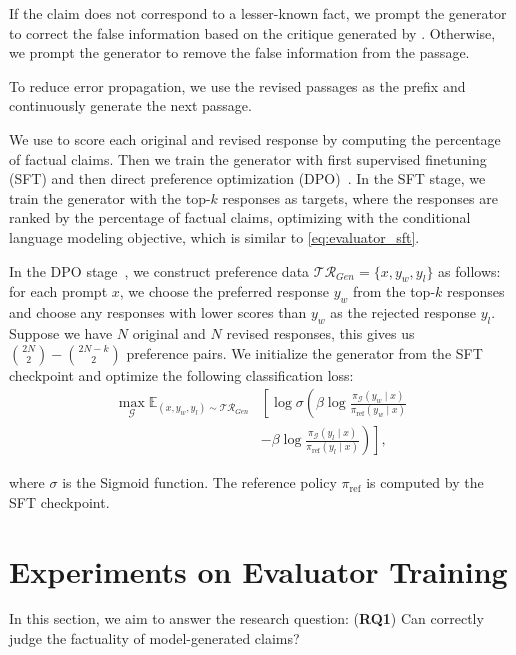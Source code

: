 If the claim does not correspond to a lesser-known fact, we prompt the generator to correct the false information based on the critique generated by \fencemodelname. Otherwise, we prompt the generator to remove the false information from the passage.

To reduce error propagation, we use the revised passages as the prefix and continuously generate the next passage.


We use \fencemodelname to score each original and revised response by computing the percentage of factual claims. Then we train the generator with first supervised finetuning (SFT) and then direct preference optimization (DPO)~\citep{DPO}.
In the SFT stage, we train the generator with the top-$k$ responses as targets, where the responses are ranked by the percentage of factual claims, optimizing with the conditional language modeling objective, which is similar to \autoref{eq:evaluator_sft}.

In the DPO stage~\citep{DPO}, we construct preference data $\mathcal{TR}_{Gen}= \{x, y_w, y_l\}$ as follows: for each prompt $x$, we choose the preferred response $y_w$ from the top-$k$ responses and choose any responses with lower scores than $y_w$ as the rejected response $y_l$.
Suppose we have $N$ original and $N$ revised responses, this gives us $\binom{2N}{2} - \binom{2N-k}{2}$ preference pairs.
We initialize the generator from the SFT checkpoint and optimize the following classification loss:
\begin{equation}
\begin{aligned}
    \max _{\mathcal{G}} 
    \mathbb{E}_{\left(x, y_w, y_l\right) \sim \mathcal{TR}_{Gen}}
    & \left[\right.
    \log \sigma
    \left(\right. \beta 
    \log \frac{\pi_\mathcal{G}\left(y_w \mid x\right)}{\pi_{\text {ref}}\left(y_w \mid x\right)} \\
    & -\beta 
    \log \frac{\pi_\mathcal{G}\left(y_l \mid x\right)}{\pi_{\text {ref}}\left(y_l \mid x\right)}
    \left.\right)
    \left.\right],
\end{aligned}
\end{equation}

where $\sigma$ is the Sigmoid function. The reference policy $\pi_{\text {ref}}$ is computed by the SFT checkpoint.






\section{Experiments on Evaluator Training}
In this section, we aim to answer the research question: (\textbf{RQ1}) Can \fencemodelname correctly judge the factuality of model-generated claims?




